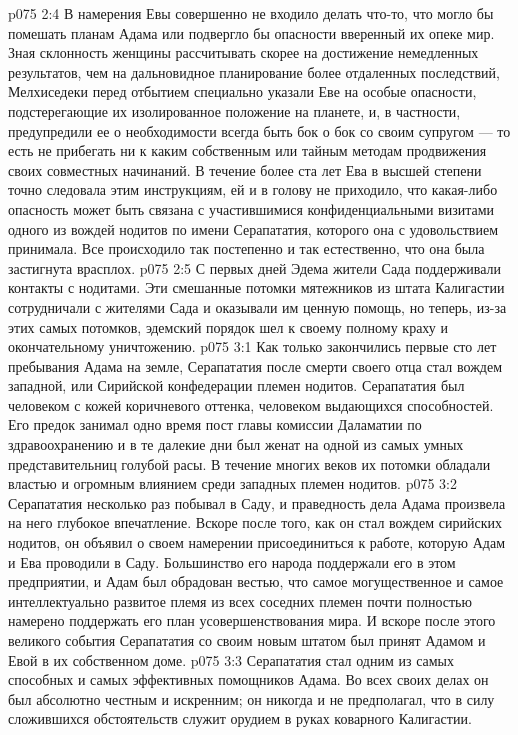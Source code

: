 \vs p075 2:4 \pc В намерения Евы совершенно не входило делать что\hyp{}то, что могло бы помешать планам Адама или подвергло бы опасности вверенный их опеке мир. Зная склонность женщины рассчитывать скорее на достижение немедленных результатов, чем на дальновидное планирование более отдаленных последствий, Мелхиседеки перед отбытием специально указали Еве на особые опасности, подстерегающие их изолированное положение на планете, и, в частности, предупредили ее о необходимости всегда быть бок о бок со своим супругом --- то есть не прибегать ни к каким собственным или тайным методам продвижения своих совместных начинаний. В течение более ста лет Ева в высшей степени точно следовала этим инструкциям, ей и в голову не приходило, что какая\hyp{}либо опасность может быть связана с участившимися конфиденциальными визитами одного из вождей нодитов по имени Серапататия, которого она с удовольствием принимала. Все происходило так постепенно и так естественно, что она была застигнута врасплох.
\vs p075 2:5 С первых дней Эдема жители Сада поддерживали контакты с нодитами. Эти смешанные потомки мятежников из штата Калигастии сотрудничали с жителями Сада и оказывали им ценную помощь, но теперь, из\hyp{}за этих самых потомков, эдемский порядок шел к своему полному краху и окончательному уничтожению.
\vs p075 3:1 Как только закончились первые сто лет пребывания Адама на земле, Серапататия после смерти своего отца стал вождем западной, или Сирийской конфедерации племен нодитов. Серапататия был человеком с кожей коричневого оттенка, человеком выдающихся способностей. Его предок занимал одно время пост главы комиссии Даламатии по здравоохранению и в те далекие дни был женат на одной из самых умных представительниц голубой расы. В течение многих веков их потомки обладали властью и огромным влиянием среди западных племен нодитов.
\vs p075 3:2 Серапататия несколько раз побывал в Саду, и праведность дела Адама произвела на него глубокое впечатление. Вскоре после того, как он стал вождем сирийских нодитов, он объявил о своем намерении присоединиться к работе, которую Адам и Ева проводили в Саду. Большинство его народа поддержали его в этом предприятии, и Адам был обрадован вестью, что самое могущественное и самое интеллектуально развитое племя из всех соседних племен почти полностью намерено поддержать его план усовершенствования мира. И вскоре после этого великого события Серапататия со своим новым штатом был принят Адамом и Евой в их собственном доме.
\vs p075 3:3 \pc Серапататия стал одним из самых способных и самых эффективных помощников Адама. Во всех своих делах он был абсолютно честным и искренним; он никогда и не предполагал, что в силу сложившихся обстоятельств служит орудием в руках коварного Калигастии.
